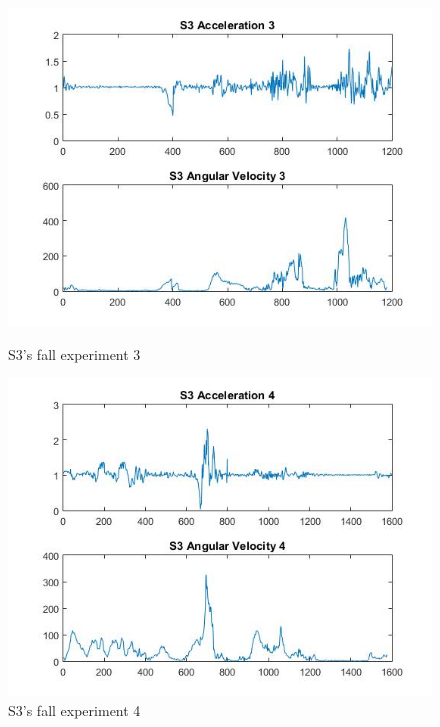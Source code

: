 \documentclass[letterpaper,12pt,titlepage,oneside,final]{book}
\begin{document}
\begin{figure}[h!]
	\centering
	\hspace{-1cm}
	\begin{minipage}[b]{0.5\textwidth}
		\centering
		\includegraphics[scale=0.42]{S3_3}
		\caption{S3's fall experiment 3}
	\end{minipage}%
	\hfill
	\begin{minipage}[b]{0.5\textwidth}
		\centering
		\includegraphics[scale=0.42]{S3_4}
		\caption{S3's fall experiment 4}
	\end{minipage}	
\end{figure}
\end{document}
